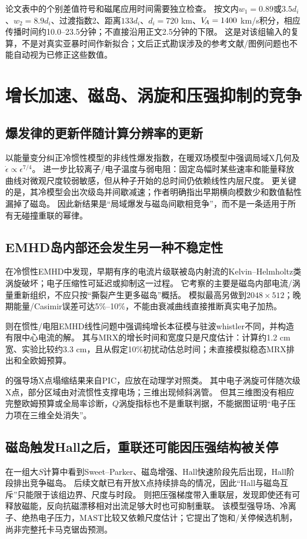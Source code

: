 论文表中的个别差值符号和磁尾应用时间需要独立检查。
按文内$w_1=0.89$或$3.5d_i$、$w_2=8.9d_i$、过渡指数2、距离$133d_i$、$d_i=720$ km、$V_{\!A}=1400$ km/s积分，相应传播时间约10.0--23.5分钟；不直接沿用正文2.5分钟的下限。
这是对该组输入的复算，不是对真实亚暴时间作新拟合；文后正式勘误涉及的参考文献/图例问题也不能自动视为已修正这些数值。

\section{增长加速、磁岛、涡旋和压强抑制的竞争}
\subsection{爆发律的更新伴随计算分辨率的更新}
\citet{L191}以能量变分纠正冷惯性模型的非线性爆发指数，\citet{L214}在暖双场模型中强调局域X几何及$\dot\epsilon\propto\epsilon^{7/4}$。
\citet{F697}进一步比较离子/电子温度与弱电阻：固定岛幅时某些速率和能量释放曲线对微观尺度较弱敏感，但从种子开始的总时间仍依赖线性内层尺度。
更关键的是，其冷模型会出次级岛并间歇减速；作者明确指出早期横向模数少和数值黏性漏掉了磁岛。
因此新结果是“局域爆发与磁岛间歇相竞争”，而不是一条适用于所有无碰撞重联的幂律。

\subsection{EMHD岛内部还会发生另一种不稳定性}
\citet{E459}在冷惯性EMHD中发现，早期有序的电流片级联被岛内射流的Kelvin--Helmholtz类涡旋破坏；电子压缩性可延迟或抑制这一过程。
它考察的主要是磁岛内部电流/涡量重新组织，不应只按“撕裂产生更多磁岛”概括。
模拟最高另做到$2048\times512$；晚期能量/Casimir误差可达5\%--10\%，不能由衰减曲线直接推断真实电子加热。

\citet{L202}则在惯性/电阻EMHD线性问题中强调纯增长本征模与驻波whistler不同，并构造有限中心电流的解。
其与MRX的增长时间和宽度只是尺度估计：计算约1.2 cm宽、实验比较约3.3 cm，且从假定10\%初扰动估总时间；未直接模拟稳态MRX排出和全欧姆预算。

\citet{L230}的强导场X点塌缩结果来自PIC，应放在动理学对照类。
其中电子涡旋可伴随次级X点，部分区域由对流惯性支撑电场；三维出现倾斜涡管。
但其三维图没有相应完整欧姆预算或全局率诊断，$Q$涡旋指标也不是重联判据，不能据图证明“电子压力项在三维全处消失”。

\subsection{磁岛触发Hall之后，重联还可能因压强结构被关停}
\citet{L159}在一组大$S$计算中看到Sweet--Parker、磁岛增强、Hall快速阶段先后出现，Hall阶段排出竞争磁岛。
后续文献已有开放X点持续排岛的情况，因此“Hall与磁岛互斥”只能限于该组边界、尺度与时段。
\citet{L174}则把压强梯度带入重联层，发现即使还有可释放磁能，反向抗磁漂移相对出流足够大时也可抑制重联。
该模型强导场、冷离子、绝热电子压力，MAST比较又依赖尺度估计；它提出了饱和/关停候选机制，尚非完整托卡马克锯齿预测。

